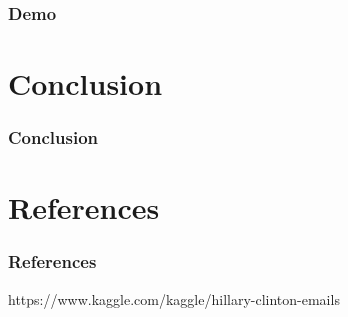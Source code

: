 \documentclass{beamer}
\begin{document}
\begin{frame}
	\frametitle{Demo}
	
\end{frame}

\section{Conclusion}

\begin{frame}
	\frametitle{Conclusion}
	
\end{frame}

\section{References}

\begin{frame}
	\frametitle{References}
	\footnotesize{
		\begin{thebibliography}{99} %
			 https://www.kaggle.com/kaggle/hillary-clinton-emails
		\end{thebibliography}
	}	
\end{frame}

\end{document}
